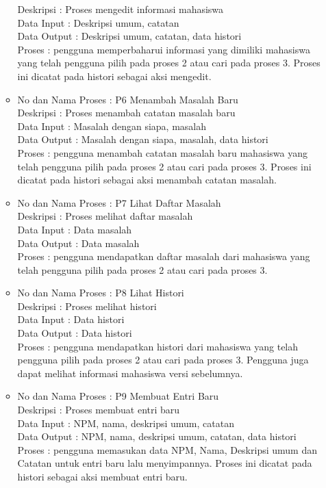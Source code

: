 \begin{enumerate}[(1)]
\begin{itemize}
Deskripsi : Proses mengedit informasi mahasiswa\\
Data Input : Deskripsi umum, catatan\\
Data Output : Deskripsi umum, catatan, data histori\\
Proses : pengguna memperbaharui informasi yang dimiliki mahasiswa yang telah pengguna pilih pada proses 2 atau cari pada proses 3. Proses ini dicatat pada histori sebagai aksi mengedit.
\item No dan Nama Proses : P6 Menambah Masalah Baru\\
Deskripsi : Proses menambah catatan masalah baru\\
Data Input : Masalah dengan siapa, masalah\\
Data Output : Masalah dengan siapa, masalah, data histori\\
Proses : pengguna menambah catatan masalah baru mahasiswa yang telah pengguna pilih pada proses 2 atau cari pada proses 3. Proses ini dicatat pada histori sebagai aksi menambah catatan masalah.
\item No dan Nama Proses : P7 Lihat Daftar Masalah\\
Deskripsi : Proses melihat daftar masalah\\
Data Input : Data masalah\\
Data Output : Data masalah\\
Proses : pengguna mendapatkan daftar masalah dari mahasiswa yang telah pengguna pilih pada proses 2 atau cari pada proses 3.
\item No dan Nama Proses : P8 Lihat Histori\\
Deskripsi : Proses melihat histori\\
Data Input : Data histori\\
Data Output : Data histori\\
Proses : pengguna mendapatkan histori dari mahasiswa yang telah pengguna
pilih pada proses 2 atau cari pada proses 3. Pengguna juga dapat melihat informasi mahasiswa versi sebelumnya.
\item No dan Nama Proses : P9 Membuat Entri Baru\\
Deskripsi : Proses membuat entri baru\\
Data Input : NPM, nama, deskripsi umum, catatan\\
Data Output : NPM, nama, deskripsi umum, catatan, data histori\\
Proses : pengguna memasukan data NPM, Nama, Deskripsi umum dan Catatan untuk entri baru lalu menyimpannya. Proses ini dicatat pada histori sebagai aksi membuat entri baru.
\end{itemize}  
\end{enumerate}